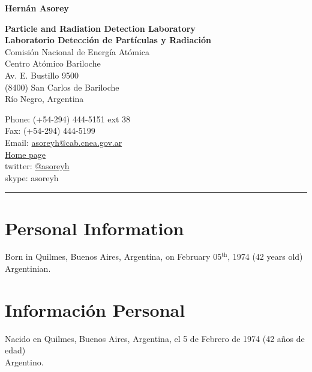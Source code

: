 \begin{center}{\huge \bf Hernán Asorey}\\[1cm]\end{center}

\begin{minipage}[t]{0.570\textwidth}
\ifeng
{\bf{Particle and Radiation Detection Laboratory}}\\
\else
{\bf{Laboratorio Detección de Partículas y Radiación}}\\
\fi
  Comisión Nacional de Energía Atómica\\
  Centro Atómico Bariloche\\
  Av. E. Bustillo 9500\\
  (8400) San Carlos de Bariloche\\
  Río Negro, Argentina\\[.2cm]
\end{minipage}
\begin{minipage}[t]{0.465\textwidth}
  Phone: (+54-294) 444-5151 ext 38\\
  Fax: (+54-294) 444-5199\\
  Email: \href{mailto:asoreyh@cab.cnea.gov.ar}{asoreyh@cab.cnea.gov.ar}\\
  \href{http://fisica.cab.cnea.gov.ar/particulas/wiki/User:Asoreyh}{Home page}\\
  twitter: \href{https://twitter.com/#!/asoreyh}{@asoreyh}\\
  skype: asoreyh\\
\end{minipage}

\hrule

\ifeng
\section*{Personal Information}
Born in Quilmes, Buenos Aires, Argentina, on February 05$^\mathrm{th}$, 1974 (42 years old)\\
Argentinian.%
\else
\section*{Información Personal}
Nacido en Quilmes, Buenos Aires, Argentina, el 5 de Febrero de 1974 (42 años de edad)\\
Argentino.%
\fi
